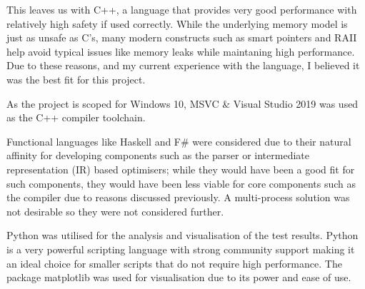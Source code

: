 This leaves us with C++, a language that provides very good performance with relatively high safety if used correctly. While the underlying memory model is just as unsafe as C's, many modern constructs such as smart pointers \cite{cpp-smart-ptrs} and RAII \cite{cpp-raii} help avoid typical issues like memory leaks while maintaning high performance. Due to these reasons, and my current experience with the language, I believed it was the best fit for this project.

As the project is scoped for Windows 10, MSVC \& Visual Studio 2019 was used as the C++ compiler toolchain.

Functional languages like Haskell and F\# were considered due to their natural affinity for developing components such as the parser or intermediate representation (IR) based optimisers; while they would have been a good fit for such components, they would have been less viable for core components such as the compiler due to reasons discussed previously. A multi-process solution was not desirable so they were not considered further.

Python was utilised for the analysis and visualisation of the test results. Python is a very powerful scripting language with strong community support making it an ideal choice for smaller scripts that do not require high performance. The package matplotlib was used for visualisation due to its power and ease of use.